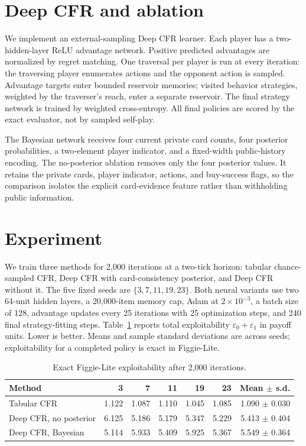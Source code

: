 \section{Deep CFR and ablation}

We implement an external-sampling Deep CFR learner. Each player has a two-hidden-layer ReLU advantage network. Positive predicted advantages are normalized by regret matching. One traversal per player is run at every iteration: the traversing player enumerates actions and the opponent action is sampled. Advantage targets enter bounded reservoir memories; visited behavior strategies, weighted by the traverser's reach, enter a separate reservoir. The final strategy network is trained by weighted cross-entropy. All final policies are scored by the exact evaluator, not by sampled self-play.

The Bayesian network receives four current private card counts, four posterior probabilities, a two-element player indicator, and a fixed-width public-history encoding. The no-posterior ablation removes only the four posterior values. It retains the private cards, player indicator, actions, and buy-success flags, so the comparison isolates the explicit card-evidence feature rather than withholding public information.

\section{Experiment}

We train three methods for 2,000 iterations at a two-tick horizon: tabular chance-sampled CFR, Deep CFR with card-consistency posterior, and Deep CFR without it. The five fixed seeds are $\{3,7,11,19,23\}$. Both neural variants use two 64-unit hidden layers, a 20,000-item memory cap, Adam at $2\times10^{-3}$, a batch size of 128, advantage updates every 25 iterations with 25 optimization steps, and 240 final strategy-fitting steps. Table~\ref{tab:main-result} reports total exploitability $\varepsilon_0+\varepsilon_1$ in payoff units. Lower is better. Means and sample standard deviations are across seeds; exploitability for a completed policy is exact in Figgie-Lite.

\begin{table}[t]
\centering
\scriptsize
\caption{Exact Figgie-Lite exploitability after 2,000 iterations.}
\label{tab:main-result}
\begin{tabular}{lrrrrrr}
\toprule
Method & 3 & 7 & 11 & 19 & 23 & Mean $\pm$ s.d. \\
\midrule
Tabular CFR & 1.122 & 1.087 & 1.110 & 1.045 & 1.085 & 1.090 $\pm$ 0.030 \\
Deep CFR, no posterior & 6.125 & 5.186 & 5.179 & 5.347 & 5.229 & 5.413 $\pm$ 0.404 \\
Deep CFR, Bayesian & 5.114 & 5.933 & 5.409 & 5.925 & 5.367 & 5.549 $\pm$ 0.364 \\
\bottomrule
\end{tabular}
\end{table}

